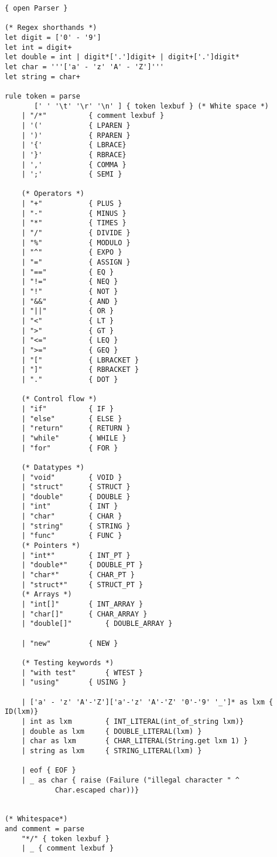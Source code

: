\documentclass{article}
\begin{document}
\begin{lstlisting}
{ open Parser }

(* Regex shorthands *)
let digit = ['0' - '9']
let int = digit+
let double = int | digit*['.']digit+ | digit+['.']digit*
let char = '''['a' - 'z' 'A' - 'Z']'''
let string = char+

rule token = parse
	   [' ' '\t' '\r' '\n' ] { token lexbuf } (* White space *)
	| "/*"			{ comment lexbuf }
	| '('			{ LPAREN }
	| ')'			{ RPAREN }
	| '{'			{ LBRACE}
	| '}'			{ RBRACE}
	| ','			{ COMMA }
	| ';'			{ SEMI }
		
	(* Operators *)
	| "+"			{ PLUS }
	| "-"			{ MINUS }
	| "*"			{ TIMES }
	| "/"			{ DIVIDE }
	| "%"			{ MODULO }
	| "^"			{ EXPO }
	| "="			{ ASSIGN }
	| "=="			{ EQ }
	| "!="			{ NEQ }
	| "!"			{ NOT }
	| "&&"			{ AND }
	| "||"			{ OR }
	| "<"			{ LT }
	| ">"			{ GT }
	| "<="			{ LEQ }
	| ">="			{ GEQ }
	| "["			{ LBRACKET }
	| "]"			{ RBRACKET }
	| "."			{ DOT }

	(* Control flow *)
	| "if"			{ IF }
	| "else"		{ ELSE }
	| "return" 		{ RETURN }
	| "while" 		{ WHILE }
	| "for"			{ FOR }
	
	(* Datatypes *)
	| "void"		{ VOID }
	| "struct"		{ STRUCT }
	| "double"		{ DOUBLE }
	| "int"			{ INT }
	| "char"		{ CHAR }
	| "string"		{ STRING }
	| "func" 		{ FUNC }
	(* Pointers *)
	| "int*"		{ INT_PT }
	| "double*"		{ DOUBLE_PT }
	| "char*"		{ CHAR_PT }
	| "struct*"		{ STRUCT_PT }
	(* Arrays *)
	| "int[]"		{ INT_ARRAY }
	| "char[]"		{ CHAR_ARRAY }
	| "double[]"		{ DOUBLE_ARRAY }

	| "new"			{ NEW }

	(* Testing keywords *)
	| "with test" 		{ WTEST }
	| "using"		{ USING }

	| ['a' - 'z' 'A'-'Z']['a'-'z' 'A'-'Z' '0'-'9' '_']* as lxm { ID(lxm)}
	| int as lxm   		{ INT_LITERAL(int_of_string lxm)}
	| double as lxm 	{ DOUBLE_LITERAL(lxm) }
	| char as lxm 		{ CHAR_LITERAL(String.get lxm 1) }
	| string as lxm 	{ STRING_LITERAL(lxm) } 

	| eof { EOF }
	| _ as char { raise (Failure ("illegal character " ^
			Char.escaped char))}


(* Whitespace*)
and comment = parse
	"*/" { token lexbuf }
	| _ { comment lexbuf }




\end{lstlisting}
\end{document}
